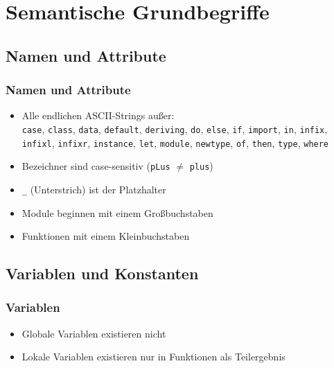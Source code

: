 \documentclass[fleqn,11pt,aspectratio=43]{beamer}
\begin{document}
\section{Semantische Grundbegriffe~}

\subsection{Namen und Attribute}
\begin{frame}
\frametitle{Namen und Attribute}
\begin{block}{\vspace*{-2ex}}
\begin{itemize}
  \item Alle endlichen ASCII-Strings außer:
  \\ \lstinline|case|, \lstinline|class|, \lstinline|data|, \lstinline|default|, \lstinline|deriving|, \lstinline|do|, \lstinline|else|, \lstinline|if|, \lstinline|import|, \lstinline|in|, \lstinline|infix|, \lstinline|infixl|, \lstinline|infixr|, \lstinline|instance|, \lstinline|let|, \lstinline|module|, \lstinline|newtype|, \lstinline|of|, \lstinline|then|, \lstinline|type|, \lstinline|where|
  \item Bezeichner sind case-sensitiv (\lstinline|pLus| $\neq$ \lstinline|plus|) 
  \item \lstinline|_| (Unterstrich) ist der Platzhalter
  \item Module beginnen mit einem Großbuchstaben
  \item Funktionen mit einem Kleinbuchstaben
\end{itemize}
\end{block}
\end{frame}

\subsection{Variablen und Konstanten}
\begin{frame}
\frametitle{Variablen}
\begin{block}{\vspace*{-2ex}}
\begin{itemize}
  \item Globale Variablen existieren nicht
  \item Lokale Variablen existieren nur in Funktionen als Teilergebnis
\end{itemize}
\end{block}
\end{frame}
\end{document}
